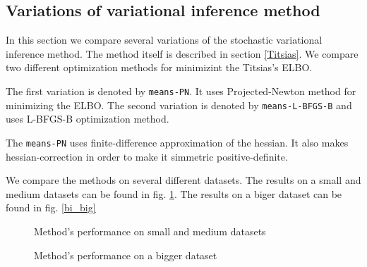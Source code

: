 \subsection{Variations of variational inference method}
	In this section we compare several variations of the stochastic variational inference method. The method itself is described in section \ref{Titsias}. We compare two different optimization methods for minimizint the Titsias's ELBO.

	The first variation is denoted by \lstinline{means-PN}. It uses Projected-Newton method for minimizing the ELBO. The second variation is denoted by \lstinline{means-L-BFGS-B} and uses L-BFGS-B optimization method.

	The \lstinline{means-PN} uses finite-difference approximation of the hessian. It also makes hessian-correction in order to make it simmetric positive-definite.

	We compare the methods on several different datasets. The results on a small and medium datasets can be found in fig. \ref{vi_small}. The results on a biger dataset can be found in fig. \ref{bi_big}

	\begin{figure}[!h]
		\centering
		\subfloat{
			\scalebox{0.75}{
				
			}
		}
		\subfloat{
			\scalebox{0.75}{
	    		
			}
		}

		\label{vi_small}
		\caption{Method's performance on small and medium datasets}
	\end{figure}
	\begin{figure}[!h]
		\centering
		\subfloat{
			\scalebox{0.75}{
				
			}
		}
		\subfloat{
			\scalebox{0.75}{
				
			}
		}
		\label{vi_big}
		\caption{Method's performance on a bigger dataset}
	\end{figure}